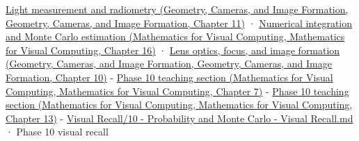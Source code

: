 \href{../03-Geometry-Cameras-and-Image-Formation/main.pdf\#nameddest=03-visual-computing-i-ch004-light-measurement-and-radiometry}{Light measurement and radiometry (Geometry, Cameras, and Image Formation, Geometry, Cameras, and Image Formation, Chapter 11)} · \href{../02-Mathematics-for-Visual-Computing/main.pdf\#nameddest=03-visual-computing-i-ch012-numerical-integration-and-monte-carlo-estimation}{Numerical integration and Monte Carlo estimation (Mathematics for Visual Computing, Mathematics for Visual Computing, Chapter 16)} · \href{../03-Geometry-Cameras-and-Image-Formation/main.pdf\#nameddest=03-visual-computing-i-ch003-lens-optics-focus-and-image-formation}{Lens optics, focus, and image formation (Geometry, Cameras, and Image Formation, Geometry, Cameras, and Image Formation, Chapter 10)} - \href{../02-Mathematics-for-Visual-Computing/main.pdf\#nameddest=02-foundations-ii-ch023-random-quantities-and-their-probability-laws}{Phase 10 teaching section (Mathematics for Visual Computing, Mathematics for Visual Computing, Chapter 7)} - \href{../02-Mathematics-for-Visual-Computing/main.pdf\#nameddest=02-foundations-ii-ch029-transformations-turn-simple-inputs-into-useful-samples}{Phase 10 teaching section (Mathematics for Visual Computing, Mathematics for Visual Computing, Chapter 13)} - \hyperref[appendix-cb5af353ef77]{Visual Recall/10 - Probability and Monte Carlo - Visual Recall.md} · Phase 10 visual recall
